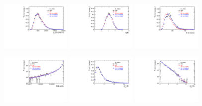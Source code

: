 \begin{figure}[h]
\centering
\includegraphics[height=!,width=0.3\textwidth]{figs/dataVsMC/signal_final/combined/Ds2all_Bs_PT.pdf}
\includegraphics[height=!,width=0.3\textwidth]{figs/dataVsMC/signal_final/combined/Ds2all_Bs_ETA.pdf}
\includegraphics[height=!,width=0.3\textwidth]{figs/dataVsMC/signal_final/combined/Ds2all_NTracks.pdf}

\includegraphics[height=!,width=0.3\textwidth]{figs/dataVsMC/signal_final/combined/Ds2all_Bs_DIRA_OWNPV.pdf}
\includegraphics[height=!,width=0.3\textwidth]{figs/dataVsMC/signal_final/combined/Ds2all_Bs_ENDVERTEX_CHI2.pdf}
\includegraphics[height=!,width=0.3\textwidth]{figs/dataVsMC/signal_final/combined/Ds2all_Bs_IPCHI2_OWNPV.pdf}


\end{figure}
